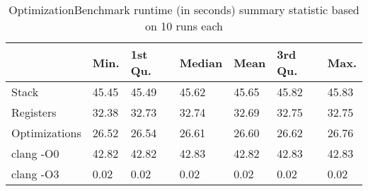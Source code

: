 \begin{table}[h!]
\centering
\begin{tabular}{p{}p{}p{}p{}p{}p{}p{}}
  \hline
 & Min. & 1st Qu. & Median & Mean & 3rd Qu. & Max. \\ 
  \hline
Stack & 45.45 & 45.49 & 45.62 & 45.65 & 45.82 & 45.83 \\ 
  Registers & 32.38 & 32.73 & 32.74 & 32.69 & 32.75 & 32.75 \\ 
  Optimizations & 26.52 & 26.54 & 26.61 & 26.60 & 26.62 & 26.76 \\ 
  clang -O0 & 42.82 & 42.82 & 42.83 & 42.82 & 42.83 & 42.83 \\ 
  clang -O3 & 0.02 & 0.02 & 0.02 & 0.02 & 0.02 & 0.02 \\ 
   \hline
\end{tabular}
\caption{OptimizationBenchmark runtime (in seconds) summary statistic based on 10 runs each}
\end{table}

